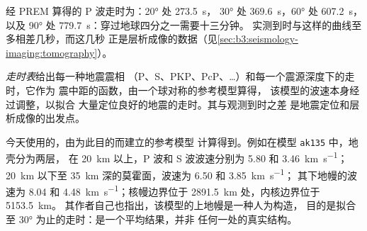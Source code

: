 经 PREM 算得的 P 波走时为：\ang{20} 处 \qty{273.5}{s}，
\ang{30} 处 \qty{369.6}{s}，\ang{60} 处 \qty{607.2}{s}，以及
\ang{90} 处 \qty{779.7}{s}：穿过地球四分之一需要十三分钟。
实测到时与这样的曲线至多相差几秒，而这几秒
正是层析成像的数据（见\cref{sec:b3:seismology-imaging:tomography}）。

\begin{definition}[走时表]\label{def:b3:seismology-imaging:tables}
\emph{走时表}给出每一种地震震相
（P、S、PKP、PcP、\dots）和每一个震源深度下的走时，它作为
震中距的函数，由一个球对称的参考模型算得，
该模型的波速本身经过调整，以拟合
大量定位良好的地震的走时。其与观测到时之差
是地震定位和层析成像的出发点。
\end{definition}

今天使用的，由为此目的而建立的参考模型
计算得到。例如在模型 \texttt{ak135} 中，地壳分为两层，
在 \qty{20}{km} 以上，P 波和 S 波波速分别为 5.80 和 \qty{3.46}{km.s^{-1}}；
\qty{20}{km} 以下至 \qty{35}{km} 深的莫霍面，波速为 6.50 和 \qty{3.85}{km.s^{-1}}；
其下地幔的波速为 8.04 和 \qty{4.48}{km.s^{-1}}；核幔边界位于
\qty{2891.5}{km} 处，内核边界位于 \qty{5153.5}{km}。
其作者自己也指出，该模型的上地幔是一种人为构造，
目的是拟合至 \ang{30} 为止的走时：是一个平均结果，并非
任何一处的真实结构。


